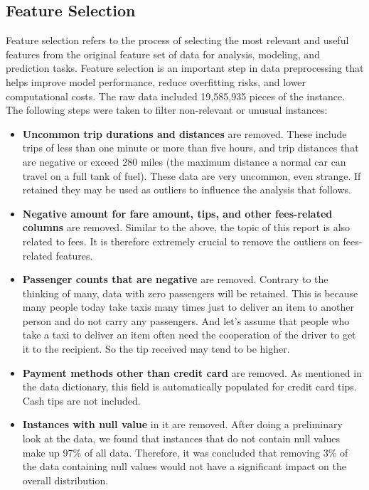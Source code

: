 \documentclass[11pt]{article}
\begin{document}
\subsection{Feature Selection}
Feature selection refers to the process of selecting the most relevant and useful features from the original feature set of data for analysis, modeling, and prediction tasks. Feature selection is an important step in data preprocessing that helps improve model performance, reduce overfitting risks, and lower computational costs. The raw data included 19,585,935 pieces of the instance. The following steps were taken to filter non-relevant or unusual instances:
\begin{itemize} 
    \item \textbf{Uncommon trip durations and distances} are removed. These include trips of less than one minute or more than five hours, and trip distances that are negative or exceed 280 miles (the maximum distance a normal car can travel on a full tank of fuel). These data are very uncommon, even strange. If retained they may be used as outliers to influence the analysis that follows.
    \item \textbf{Negative amount for fare amount, tips, and other fees-related columns} are removed. Similar to the above, the topic of this report is also related to fees. It is therefore extremely crucial to remove the outliers on fees-related features.
    \item \textbf{Passenger counts that are negative} are removed. Contrary to the thinking of many, data with zero passengers will be retained. This is because many people today take taxis many times just to deliver an item to another person and do not carry any passengers. And let's assume that people who take a taxi to deliver an item often need the cooperation of the driver to get it to the recipient. So the tip received may tend to be higher.
    \item \textbf{Payment methods other than credit card} are removed. As mentioned in the data dictionary, this field is automatically populated for credit card tips. Cash tips are not included. 
    \item \textbf{Instances with null value} in it are removed. After doing a preliminary look at the data, we found that instances that do not contain null values make up 97\% of all data. Therefore, it was concluded that removing 3\% of the data containing null values would not have a significant impact on the overall distribution.
\end{itemize} 
\end{document}

